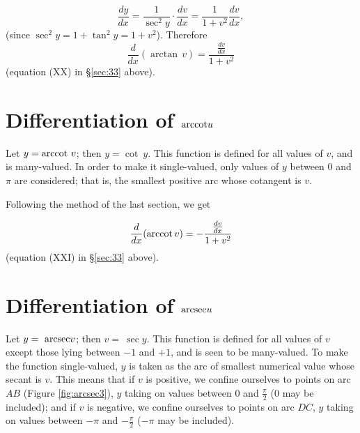 \[
\frac{dy}{dx} 	= \frac{1}{\sec^2 y} \cdot \frac{dv}{dx}
  	= \frac{1}{1 + v^2} \frac{dv}{dx},
\]
(since $\sec^2y = 1 + \tan^2y = 1 + v^2$). Therefore
\[
\frac{d}{dx} (\arctan\, v) 	= \frac{\frac{dv}{dx}}{1 + v^2}
\]
(equation (XX) in \S \ref{sec:33}  above).



\section{Differentiation of ${\rm arccot} u$}

Let $y 	= {\rm arccot}\ v$; then $y 	= \cot\ y$.
This function is defined for all values of $v$, and is many-valued.%
In order to make it single-valued, only values of $y$ between $0$ and $\pi$ are considered; 
that is, the smallest positive arc whose cotangent is $v$. %

Following the method of the last section, we get

\[
\frac{d}{dx}({\rm arccot}\, v) = -\frac{\frac{dv}{dx}}{1 + v^2}
\]
(equation (XXI) in \S \ref{sec:33}  above).

\section{Differentiation of ${\rm arcsec} u$}

Let
 $y 	=\ {\rm arcsec} v$; then $v 	=\ \sec y$.
This function is defined for all values of $v$ except those lying between $-1$ and $+1$, 
and is seen to be many-valued. To make the function single-valued, $y$ is taken as 
the arc of smallest numerical value whose secant is $v$. This means that if $v$ is positive, 
we confine ourselves to points on arc $AB$ (Figure \ref{fig:arcsec3}), $y$ taking on 
values between $0$ and $\frac{\pi}{2}$ ($0$ may be included); and if $v$ is negative, 
we confine ourselves to points on arc $DC$, $y$ taking on values between $-\pi$ and 
$-\frac{\pi}{2}$ ($-\pi$ may be included).



